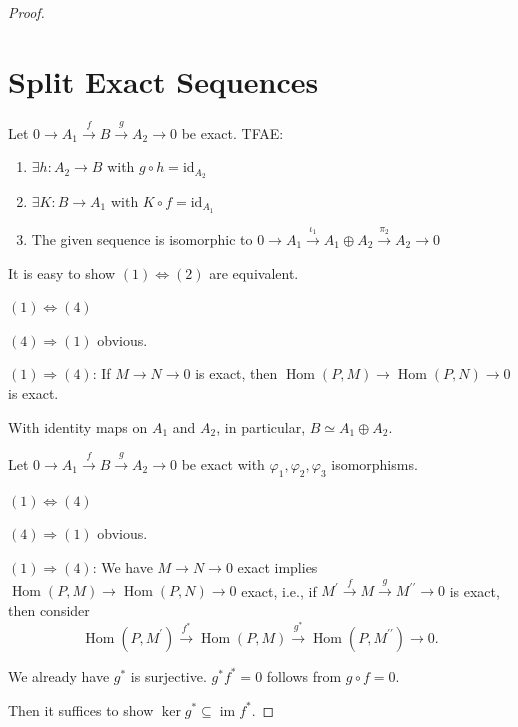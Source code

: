 \documentclass[11pt, a4paper]{report}
\begin{document}
\begin{proof}
\section*{Split Exact Sequences}

Let $0 \rightarrow A_{1} \xrightarrow{f} B \xrightarrow{g} A_{2} \rightarrow 0$ be exact. TFAE:
\begin{enumerate}
    \item $\exists h: A_{2} \rightarrow B$ with $g \circ h = \mathrm{id}_{A_{2}}$
    \item $\exists K: B \rightarrow A_{1}$ with $K \circ f = \mathrm{id}_{A_{1}}$
    \item The given sequence is isomorphic to $0 \rightarrow A_{1} \xrightarrow{\iota_{1}} A_{1} \oplus A_{2} \xrightarrow{\pi_{2}} A_{2} \rightarrow 0$
\end{enumerate}

It is easy to show $(1) \Leftrightarrow (2)$ are equivalent.

$(1) \Leftrightarrow (4)$

$(4) \Rightarrow (1)$ obvious.

$(1) \Rightarrow (4)$: If $M \rightarrow N \rightarrow 0$ is exact, then $\operatorname{Hom}(P, M) \rightarrow \operatorname{Hom}(P, N) \rightarrow 0$ is exact.

With identity maps on $A_{1}$ and $A_{2}$, in particular, $B \simeq A_{1} \oplus A_{2}$.

Let $0 \rightarrow A_{1} \xrightarrow{f} B \xrightarrow{g} A_{2} \rightarrow 0$ be exact with $\varphi_{1}, \varphi_{2}, \varphi_{3}$ isomorphisms.

$(1) \Leftrightarrow (4)$

$(4) \Rightarrow (1)$ obvious.

$(1) \Rightarrow (4)$: We have $M \rightarrow N \rightarrow 0$ exact implies $\operatorname{Hom}(P, M) \rightarrow \operatorname{Hom}(P, N) \rightarrow 0$ exact, i.e., if $M^{\prime} \xrightarrow{f} M \xrightarrow{g} M^{\prime \prime} \rightarrow 0$ is exact, then consider
\[
\operatorname{Hom}\left(P, M^{\prime}\right) \xrightarrow{f^{*}} \operatorname{Hom}(P, M) \xrightarrow{g^{*}} \operatorname{Hom}\left(P, M^{\prime \prime}\right) \rightarrow 0.
\]

We already have $g^{*}$ is surjective. $g^{*} f^{*}=0$ follows from $g \circ f=0$.

Then it suffices to show $\operatorname{ker} g^{*} \subseteq \operatorname{im} f^{*}$.


\end{proof}
\end{document}
